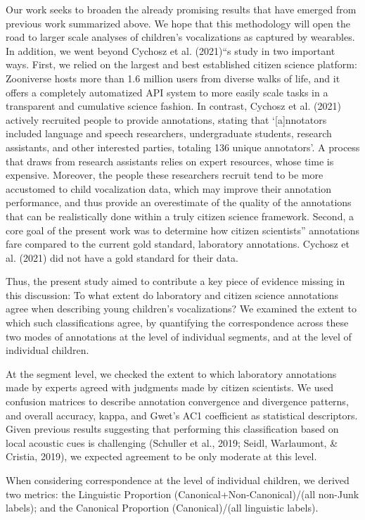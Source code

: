 \documentclass[english,,man]{apa6}
\begin{document}
Our work seeks to broaden the already promising results that have emerged from previous work summarized above. We hope that this methodology will open the road to larger scale analyses of children's vocalizations as captured by wearables. In addition, we went beyond Cychosz et al. (2021)\enquote{s study in two important ways. First, we relied on the largest and best established citizen science platform: Zooniverse hosts more than 1.6 million users from diverse walks of life, and it offers a completely automatized API system to more easily scale tasks in a transparent and cumulative science fashion. In contrast, Cychosz et al. (2021) actively recruited people to provide annotations, stating that \enquote{{[}a{]}nnotators included language and speech researchers, undergraduate students, research assistants, and other interested parties, totaling 136 unique annotators}. A process that draws from research assistants relies on expert resources, whose time is expensive. Moreover, the people these researchers recruit tend to be more accustomed to child vocalization data, which may improve their annotation performance, and thus provide an overestimate of the quality of the annotations that can be realistically done within a truly citizen science framework. Second, a core goal of the present work was to determine how citizen scientists} annotations fare compared to the current gold standard, laboratory annotations. Cychosz et al. (2021) did not have a gold standard for their data.

Thus, the present study aimed to contribute a key piece of evidence missing in this discussion: To what extent do laboratory and citizen science annotations agree when describing young children's vocalizations? We examined the extent to which such classifications agree, by quantifying the correspondence across these two modes of annotations at the level of individual segments, and at the level of individual children.

At the segment level, we checked the extent to which laboratory annotations made by experts agreed with judgments made by citizen scientists. We used confusion matrices to describe annotation convergence and divergence patterns, and overall accuracy, kappa, and Gwet's AC1 coefficient as statistical descriptors. Given previous results suggesting that performing this classification based on local acoustic cues is challenging (Schuller et al., 2019; Seidl, Warlaumont, \& Cristia, 2019), we expected agreement to be only moderate at this level.

When considering correspondence at the level of individual children, we derived two metrics: the Linguistic Proportion (Canonical+Non-Canonical)/(all non-Junk labels); and the Canonical Proportion (Canonical)/(all linguistic labels).
\end{document}
